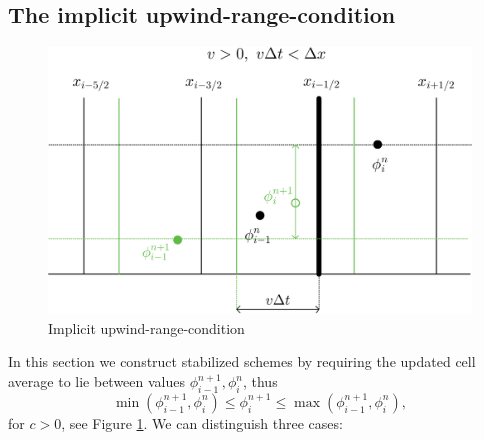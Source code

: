 \documentclass[../thesis.tex]{subfiles}
\begin{document}
\subsection[]{The implicit upwind-range-condition}
\begin{figure}[H]
	\centering
	\includegraphics[width=\textwidth]{Implicit-urc-crop.pdf}
	\caption{Implicit upwind-range-condition}
	\label{fig:implicit-urc}
\end{figure}
In this section we construct stabilized schemes by requiring the updated cell average to lie between values \(\phi_{i-1}^{n+1},\phi_{i}^{n}\), thus
\begin{equation}\label{eqn:implicit-upwind-range-condition}
    \min\left( \phi_{i-1}^{n+1},\phi_{i}^{n} \right)
    \leq
    \phi_{i}^{n+1}
    \leq
    \max\left( \phi_{i-1}^{n+1},\phi_{i}^{n} \right),
\end{equation}
for \(c > 0\), see Figure \ref{fig:implicit-urc}. We can distinguish three cases:
\end{document}

